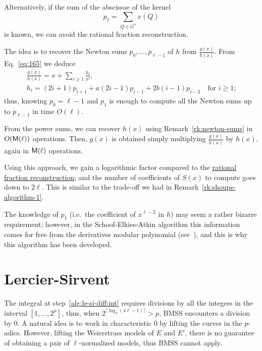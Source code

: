 \begin{remark}
  \label{rk:bmss}
  Alternatively, if the sum of the abscissae of the kernel
  \begin{equation}
    \label{eq:182}
    p_1 = \sum_{Q\in G^\ast}x(Q)
  \end{equation}
  is known, we can avoid the rational fraction reconstruction.

  The idea is to recover the Newton sums $p_0,\ldots,p_{\ell-1}$ of
  $h$ from $\frac{g(x)}{h(x)}$. From Eq.~\eqref{eq:165} we deduce
  \begin{equation}
    \label{eq:181}
    \begin{gathered}
      \frac{g(x)}{h(x)} = x + \sum_{i\ge1}\frac{h_i}{x^i}\text{,}\\
      h_i = (2i+1)p_{i+1} + a(2i-1)p_{i-1} + 2b(i-1)p_{i-2}
      \quad\text{for $i\ge1$;}
    \end{gathered}
  \end{equation}
  thus, knowing $p_0=\ell-1$ and $p_1$ is enough to compute all the
  Newton sums up to $p_{\ell-1}$ in time $O(\ell)$.

  From the power sums, we can recover $h(x)$ using
  Remark~\ref{rk:newton-sums} in $O(\mathsf{M}(\ell))$ operations. Then,
  $g(x)$ is obtained simply multiplying $\frac{g(x)}{h(x)}$ by $h(x)$,
  again in $\mathsf{M}(\ell)$ operations.

  Using this approach, we gain a logarithmic factor compared to the
  \hyperref[sec:eucl-algor-rati]{rational fraction reconstruction};
  and the number of coefficients of $S(x)$ to compute goes down to
  $2\ell$. This is similar to the trade-off we had in
  Remark~\ref{rk:shoups-algorithm-1}.

  The knowledge of $p_1$ (i.e.\ the coefficient of $x^{\ell-2}$ in
  $h$) may seem a rather bizarre requirement; however, in the
  Schoof-Elkies-Atkin algorithm this information comes for free from
  the derivatives modular polynomial (see~\cite{elkies98,morain95}),
  and this is why this algorithm has been developed.
\end{remark}



\section{Lercier-Sirvent}
\label{sec:lercier-sirvent}
The integral at step~\ref{alg:le-si-diff:int} requires divisions by
all the integers in the interval $[1,\ldots,2^\mu]$, thus, when
$2^{\lceil\log_2(4\ell-1)\rceil}>p$,  BMSS encounters a division by
$0$. A natural idea is to work in characteristic $0$ by lifting the
curves in the $p$-adics. However, lifting the Weierstrass models of
$E$ and $E'$, there is no guarantee of obtaining a pair of
$\ell$-normalized models, thus BMSS cannot apply.

